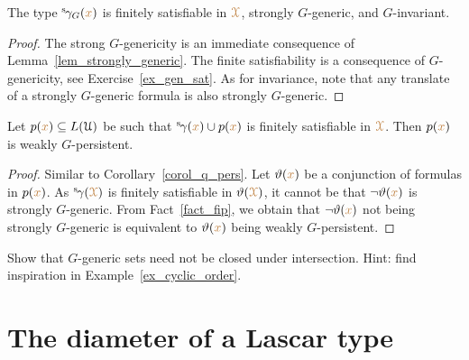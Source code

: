 
\begin{corollary}\label{corol_str_gen}
  The type ${}^{\rm s}\kern-.2ex\gamma_G({\color{brown} x})$ is finitely satisfiable in ${\color{brown}\EuScript X}$, strongly $G$-generic, and $G$-invariant.
\end{corollary}

\begin{proof}
  The strong $G$-genericity is an immediate consequence of Lemma~\ref{lem_strongly_generic}.
  The finite satisfiability is a consequence of $G$-genericity, see Exercise~\ref{ex_gen_sat}.
  As for invariance, note that any translate of a strongly $G$-generic formula is also strongly $G$-generic.
\end{proof}

\begin{corollary}\label{corol_q_w_pers}
  Let $p({\color{brown} x})\subseteq L(\EuScript U)$ be such that ${}^{\rm s}\kern-.2ex\gamma({\color{brown} x})\cup p({\color{brown} x})$ is finitely satisfiable in ${\color{brown}\EuScript X}$.
  Then $p({\color{brown} x})$ is weakly $G$-persistent.
\end{corollary}

\begin{proof}
  Similar to Corollary~\ref{corol_q_pers}.
  Let $\vartheta({\color{brown} x})$ be a conjunction of formulas in $p({\color{brown} x})$.
  As ${}^{\rm s}\kern-.2ex\gamma({\color{brown}\EuScript X})$ is finitely satisfiable in $\vartheta({\color{brown}\EuScript X})$, it cannot be that $\neg\vartheta({\color{brown} x})$ is strongly $G$-generic.
  From Fact~\ref{fact_fip}, we obtain that $\neg\vartheta({\color{brown} x})$ not being strongly $G$-generic is equivalent to $\vartheta({\color{brown} x})$  being weakly $G$-persistent.
\end{proof}

\begin{exercise}
  Show that $G$-generic sets need not be closed under intersection.
  Hint: find inspiration in Example~\ref{ex_cyclic_order}.
\end{exercise}

\section{The diameter of a Lascar type}\label{newelski}


